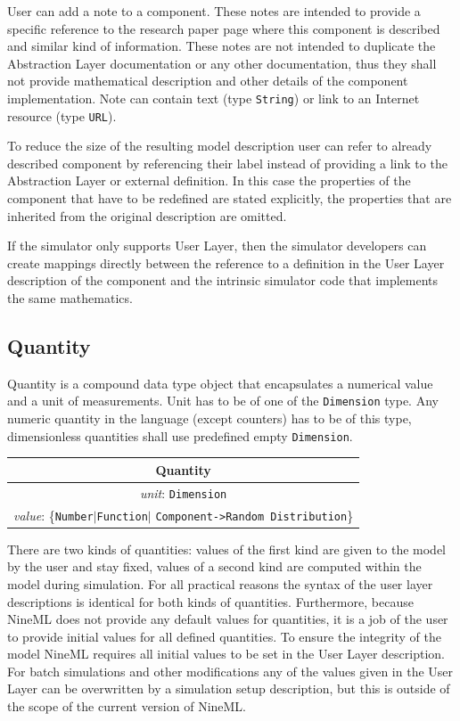 \documentclass{article}
\begin{document}
User can add a note to a component. These notes are intended to provide
a specific reference to the research paper page where this component is
described and similar kind of information. These notes are not intended
to duplicate the Abstraction Layer documentation or any other
documentation, thus they shall not provide mathematical description and
other details of the component implementation. Note can contain text
(type {\tt String}) or link to an Internet resource (type {\tt URL}).

To reduce the size of the resulting model description user can refer to
already described component by referencing their label instead of providing
a link to the Abstraction Layer or external definition. In this case the
properties of the component that have to be redefined are stated explicitly,
the properties that are inherited from the original description are omitted.

If the simulator only supports User Layer, then the simulator developers
can create mappings directly between the reference to a definition in the
User Layer description of the component and the intrinsic simulator code
that implements the same mathematics.

\subsection{Quantity}
\label{quantity}

Quantity is a compound data type object that encapsulates a numerical value
and a unit of measurements. Unit has to be of one of the {\tt Dimension} type.
Any numeric quantity in the language (except counters) has to be of this type,
dimensionless quantities shall use predefined empty {\tt Dimension}.

\begin{table}[htb]
\center
\begin{tabular}{|c|}
\hline
\hline
Quantity \\
\hline
\hline
{\em unit}: {\tt Dimension} \\
\hline
{\em value}: \{{\tt Number}$|${\tt Function}$|$%
{\tt Component->Random Distribution}\} \\
\hline
\end{tabular}
\end{table}

There are two kinds of quantities: values of the first kind are given to the
model by the user and stay fixed, values of a second kind are computed within
the model during simulation. For all practical reasons the syntax of the user
layer descriptions is identical for both kinds of quantities. Furthermore,
because NineML does not provide any default values for quantities, it is a
job of the user to provide initial values for all defined quantities. To
ensure the integrity of the model NineML requires all initial values to be
set in the User Layer description. For batch simulations and other
modifications any of the values given in the User Layer can be overwritten
by a simulation setup description, but this is outside of the scope of the
current version of NineML.
\end{document}
